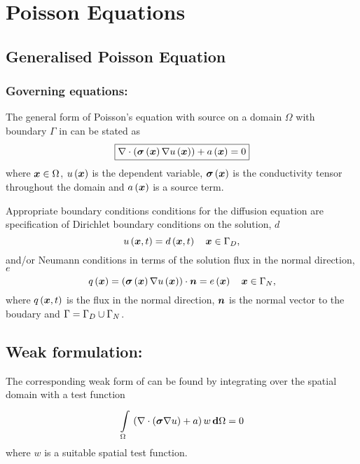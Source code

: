 \section{Poisson Equations} 

\subsection{Generalised Poisson Equation} 

\subsubsection{Governing equations:}

The general form of Poisson's equation with source on a domain $\Omega$ with boundary
$\Gamma$ in \OpenCMISS can be stated as
\begin{equation}
  \boxed{
    \divergence{}{\pbrac{\fnof{\tensor{\sigma}}{\vectr{x}}\gradient{}{\fnof{u}{\vectr{x}}}}}+
    \fnof{a}{\vectr{x}}=0
  }
  \label{eqn:Poissonequation}
\end{equation}
where $\boldsymbol{x}\in\Omega$, $ u\left( \boldsymbol{x} \right) $ is the dependent variable, 
$ \boldsymbol{\mathit{\sigma}}\left( \boldsymbol{x} \right) $ is the conductivity tensor throughout 
the domain and $ a\left( \boldsymbol{x} \right) $ is a source term.

Appropriate boundary conditions conditions for the diffusion
equation are specification of Dirichlet boundary conditions on the solution,
$d$ \ie
\begin{equation}
  \fnof{u}{\vectr{x},t} = \fnof{d}{\vectr{x},t} \quad \vectr{x}\in\Gamma_{D},
  \label{eqn:PoissonDirichletBC} 
\end{equation}
and/or Neumann conditions in terms of the solution flux in the normal
direction, $e$ \ie
\begin{equation}
  \fnof{q}{\vectr{x}} = \dotprod{\pbrac{\fnof{\tensor{\sigma}}{\vectr{x}}
      \gradient{}{\fnof{u}{\vectr{x}}}}}{\normal} =
  \fnof{e}{\vectr{x}} \quad \vectr{x}\in\Gamma_{N},
  \label{eqn:PoissonNeumannBC} 
\end{equation}
where $ q\left( \boldsymbol{x},t \right) $ is the flux in the normal direction, $\boldsymbol{n}$ is the normal
vector to the boudary and $\Gamma=\Gamma_{D}\cup\Gamma_{N}$.

\subsection{Weak formulation:}

The corresponding weak form of  can be found by
integrating over the spatial domain with a test function \ie
\begin{equation}
  \gint{\Omega}{}{\pbrac{\divergence{}{\pbrac{\tensor{\sigma}\gradient{}{u}}}+a}w}{\Omega}=0
  \label{eqn:Poissonweakform1}
\end{equation}
where $w$ is a suitable spatial test function.

